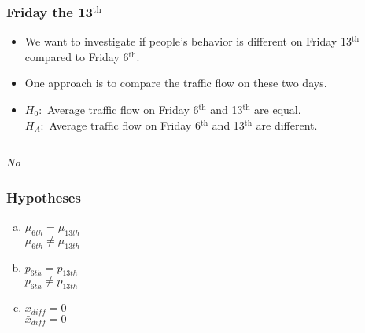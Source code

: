 \documentclass[slidestop,compress,mathserif]{beamer}
\newcommand{\soln}[1]{\textit{#1}}
\begin{document}
\begin{frame}
\frametitle{Friday the 13$^{\text{th}}$}

\begin{itemize}

\item We want to investigate if people's behavior is different on Friday 13$^{\text{th}}$ compared to Friday 6$^{\text{th}}$.

\pause

\item One approach is to compare the traffic flow on these two days.

\pause

\item $H_0:$ Average traffic flow on Friday 6$^{\text{th}}$ and 13$^{\text{th}}$ are equal. \\
$H_A:$ Average traffic flow on Friday 6$^{\text{th}}$ and 13$^{\text{th}}$ are different.

\pause

\end{itemize}

$\:$ \\


\soln{\pause No}

\end{frame}


\begin{frame}
\frametitle{Hypotheses}


\begin{enumerate}[(a)]
\item  {} $\mu_{6th} = \mu_{13th}$ \\
 $\mu_{6th} \ne \mu_{13th}$
\item  {} $p_{6th} = p_{13th}$ \\
 $p_{6th} \ne p_{13th}$
\item  {} $\bar{x}_{diff} = 0$ \\
 $\bar{x}_{diff} = 0$
\end{enumerate}

\end{frame}
\end{document}
